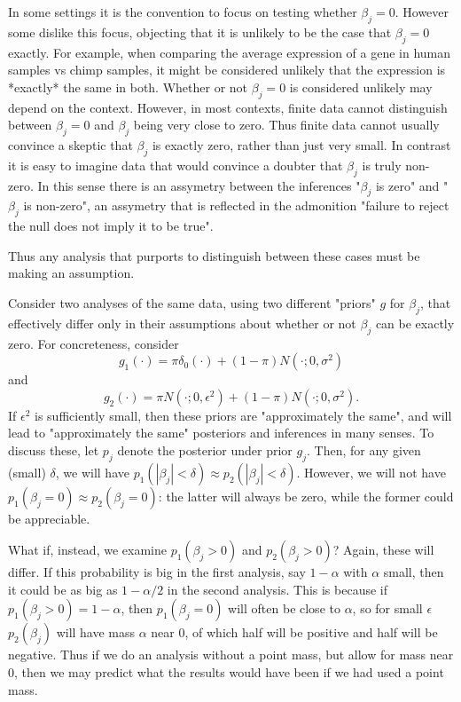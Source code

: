 \documentclass[11pt]{article}
\begin{document}
In some settings it is the convention to focus on testing whether $\beta_j=0$. However some dislike this focus, objecting that it is unlikely to be the case that $\beta_j=0$ exactly. For example, when comparing the average expression of a gene in human samples vs chimp samples, it might be considered unlikely that the expression
is *exactly* the same in both. Whether or not $\beta_j=0$
is considered unlikely may depend on the context.
However, in most contexts, finite data cannot
distinguish between $\beta_j=0$ and $\beta_j$ being very close to zero. Thus finite data cannot usually convince a skeptic that $\beta_j$ is exactly zero, rather than just very small. In contrast it is easy to imagine data that would convince a doubter that $\beta_j$ is truly non-zero. In this sense there is an assymetry between the inferences "$\beta_j$ is zero" and "$\beta_j$ is non-zero", an assymetry that is reflected in the admonition "failure to reject the null does not imply it to be true".

Thus any analysis that purports to distinguish between these cases must be making an assumption. 

Consider two analyses of the same data, using two different "priors" $g$ for $\beta_j$, that effectively differ only in their assumptions about whether or not $\beta_j$ can be exactly zero. For concreteness, consider
\[ g_1(\cdot) = \pi \delta_0(\cdot) + (1-\pi) N(\cdot; 0,\sigma^2) \]
and
\[g_2(\cdot) = \pi N(\cdot; 0, \epsilon^2) + (1-\pi) N(\cdot; 0, \sigma^2).\]
If $\epsilon^2$ is sufficiently small, then these 
priors are "approximately the same", and will lead to "approximately the same" posteriors and inferences in many senses. To discuss these, let $p_j$ denote the posterior under prior $g_j$. Then, for any given (small) $\delta$, we will have $p_1(|\beta_j|<\delta) \approx p_2(|\beta_j|< \delta)$. However, we will not have $p_1(\beta_j=0) \approx p_2(\beta_j=0)$: the latter will always be zero, while the former could be appreciable.

 What if, instead, we examine $p_1(\beta_j >0)$ and $p_2(\beta_j >0)$? Again, these will differ. If this probability is big in the first analysis, say $1-\alpha$ with $\alpha$ small, then it could be as big as $1-\alpha/2$ in the second analysis. This is because if $p_1(\beta_j>0)=1-\alpha$, then $p_1(\beta_j=0)$ will often be close to $\alpha$, so for small $\epsilon$ $p_2(\beta_j)$ will have mass $\alpha$ near 0, of which half will be positive and half will be negative. 
Thus if we do an analysis without a point mass, but allow
for mass near 0, then we may predict what the results would have been if we had used a point mass.
\end{document}
